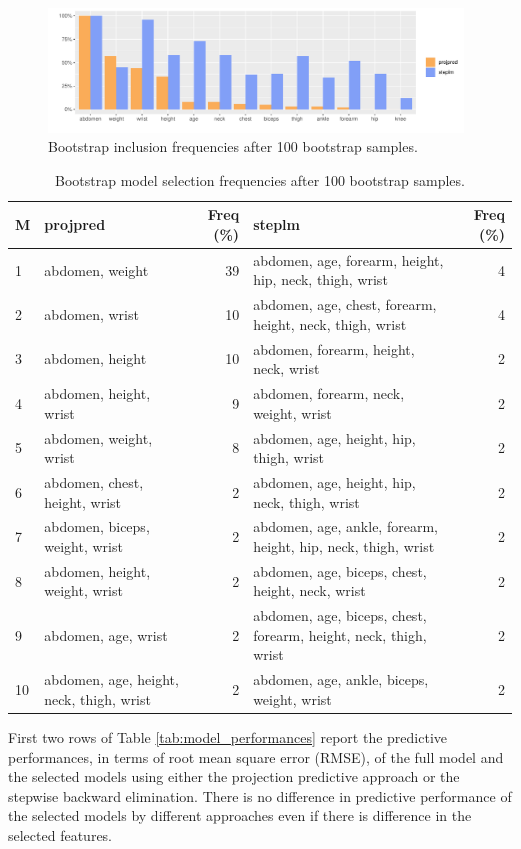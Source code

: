 \documentclass[american,]{article}
\theoremstyle{definition}
\begin{document}
\begin{figure}[tp]
  \centering
  \includegraphics[width=0.98\textwidth]{graphics/inc_prob.pdf}
  \caption{Bootstrap inclusion frequencies after 100 bootstrap samples.}
  \label{fig:inclusion_frequencies}
\end{figure}


\begin{table}[tp]
\scriptsize
\centering
\begin{tabular}{l||l|r||l|r}
  \hline
M & projpred & Freq (\%) & steplm & Freq (\%)  \\ 
  \hline
1 & abdomen, weight & 39 & abdomen, age, forearm, height, hip, neck, thigh, wrist & 4 \\
2 & abdomen, wrist & 10 & abdomen, age, chest, forearm, height, neck, thigh, wrist & 4 \\
3 & abdomen, height & 10 & abdomen, forearm, height, neck, wrist & 2 \\
4 & abdomen, height, wrist & 9 & abdomen, forearm, neck, weight, wrist & 2 \\
5 & abdomen, weight, wrist & 8 & abdomen, age, height, hip, thigh, wrist & 2 \\
6 & abdomen, chest, height, wrist & 2 & abdomen, age, height, hip, neck, thigh, wrist & 2 \\
7 & abdomen, biceps, weight, wrist & 2 & abdomen, age, ankle, forearm, height, hip, neck, thigh, wrist & 2 \\
8 & abdomen, height, weight, wrist & 2 & abdomen, age, biceps, chest, height, neck, wrist & 2 \\
9 & abdomen, age, wrist & 2 & abdomen, age, biceps, chest, forearm, height, neck, thigh, wrist & 2 \\
10 & abdomen, age, height, neck, thigh, wrist & 2 & abdomen, age, ankle, biceps, weight, wrist & 2 \\
   \hline
\end{tabular}
\caption{Bootstrap model selection frequencies after 100 bootstrap samples.}
\label{tab:model_frequencies}
\end{table}


First two rows of Table \ref{tab:model_performances} report the
predictive performances, in terms of root mean square error (RMSE), of
the full model and the selected models using either the projection
predictive approach or the stepwise backward elimination.  There is no
difference in predictive performance of the selected models by
different approaches even if there is difference in the selected
features.
\end{document}
